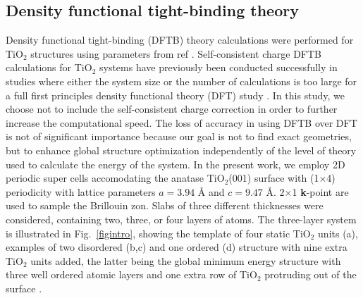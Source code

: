 \documentclass[aip,amsmath,amssymb,reprint]{revtex4-1}
\begin{document}
\subsection{Density functional tight-binding theory}
Density functional tight-binding (DFTB) theory calculations were
performed for TiO$_2$ structures using parameters from ref \cite{dolgonos2010}. Self-consistent charge DFTB calculations for TiO$_2$ systems have previously been conducted
successfully in studies where either the system size or the number of calculations is too large for a full first principles density functional theory (DFT) study \cite{Selli2017a, Selli2017b}. In this study, we choose not to include the self-consistent charge correction in order to further increase the computational speed. The loss of accuracy in using DFTB over DFT is not of significant importance because our goal is
not to find exact geometries, but  to enhance global structure optimization independently of the level of theory
used to calculate the energy of the system.
In the present work, we
employ 2D periodic super cells accomodating the anatase TiO$_2$(001)
surface with (1$\times$4) periodicity with lattice parameters $a=3.94$ {\AA} and $c=9.47$ {\AA}. 2$\times$1 \textbf{k}-point are used to sample the Brillouin zon.
Slabs of three different
thicknesses were considered, containing two, three, or four layers of
atoms. The three-layer system is illustrated in Fig.\  \ref{figintro},
showing the template of four static TiO$_2$ units (a), examples of
two disordered (b,c) and one ordered (d) structure with nine extra TiO$_2$ units added, the latter being the
global minimum energy structure with three well ordered atomic layers
and one extra row of TiO$_2$ protruding out of the surface \cite{anatase2}.
\end{document}
